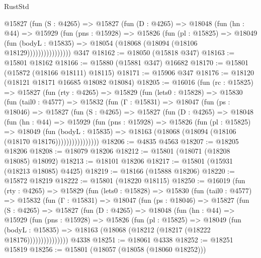 \begin{lexlean}{RustStd}
\begin{coremodule}
                @15827
                  (fun (S : @4265) =>
                  @15827
                    (fun (D : @4265) =>
                    @18048
                      (fun (hn : @44) =>
                      @15929
                        (fun (pns : @15928) =>
                        @15826
                          (fun (pl : @15825) =>
                          @18049
                            (fun (bodyL : @15835) =>
                            @18054 (@18068 (@18094 (@18106 @18129))))))))))))))))
    @347
@18162 := @18050 (@15818 @347)
@18163 := @15801 @18162
@18166 := @15880 (@15881 @347) @16682
@18170 := @15801 (@15872 (@18166 @18111) @18115)
@18171 := @15906 @347
@18176 := @18120 (@18121 @18171 @16685 @18082 @18084)
@18205 := @16016
    (fun (rc : @15825) =>
    @15827
      (fun (rty : @4265) =>
      @15829
        (fun (lets0 : @15828) =>
        @15830
          (fun (tail0 : @4577) =>
          @15832
            (fun (Γ : @15831) =>
            @18047
              (fun (ps : @18046) =>
              @15827
                (fun (S : @4265) =>
                @15827
                  (fun (D : @4265) =>
                  @18048
                    (fun (hn : @44) =>
                    @15929
                      (fun (pns : @15928) =>
                      @15826
                        (fun (pl : @15825) =>
                        @18049
                          (fun (bodyL : @15835) =>
                          @18163 (@18068 (@18094 (@18106 (@18170 @18176))))))))))))))))
@18206 := @4835 @4563
@18207 := @18205 @18206
@18208 := @18079 @18206
@18212 := @15801 (@18071 (@18208 @18085) @18092)
@18213 := @18101 @18206
@18217 := @15801 (@15931 (@18213 @18085) @4425)
@18219 := @18166 (@15888 @18206)
@18220 := @15872 @18219
@18222 := @15801 (@18220 @18115)
@18250 := @16019
    (fun (rty : @4265) =>
    @15829
      (fun (lets0 : @15828) =>
      @15830
        (fun (tail0 : @4577) =>
        @15832
          (fun (Γ : @15831) =>
          @18047
            (fun (ps : @18046) =>
            @15827
              (fun (S : @4265) =>
              @15827
                (fun (D : @4265) =>
                @18048
                  (fun (hn : @44) =>
                  @15929
                    (fun (pns : @15928) =>
                    @15826
                      (fun (pl : @15825) =>
                      @18049
                        (fun (bodyL : @15835) =>
                        @18163 (@18068 (@18212 (@18217 (@18222 @18176)))))))))))))))
    @4338
@18251 := @18061 @4338
@18252 := @18251 @15819
@18256 := @15801 (@18057 (@18058 (@18060 @18252)))

\end{coremodule}
\end{lexlean}

